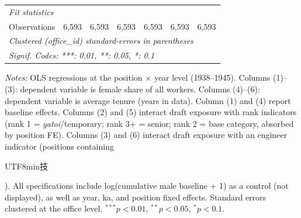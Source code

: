 \begin{table}[htbp]
\begin{threeparttable}
\begin{tabular}{lcccccc}
   \midrule
   \emph{Fit statistics}\\
   Observations                   & 6,593    & 6,593          & 6,593          & 6,593           & 6,593          & 6,593\\  
   \midrule \midrule
   \multicolumn{7}{l}{\emph{Clustered (office\_id) standard-errors in parentheses}}\\
   \multicolumn{7}{l}{\emph{Signif. Codes: ***: 0.01, **: 0.05, *: 0.1}}\\
\end{tabular}
\begin{tablenotes}[flushleft]
\footnotesize
\item \textit{Notes:} OLS regressions at the position $\times$ year level (1938--1945). Columns (1)--(3): dependent variable is female share of all workers. Columns (4)--(6): dependent variable is average tenure (years in data). Column (1) and (4) report baseline effects. Columns (2) and (5) interact draft exposure with rank indicators (rank 1 = \emph{yatoi}/temporary; rank 3+ = senior; rank 2 = base category, absorbed by position FE). Columns (3) and (6) interact draft exposure with an engineer indicator (positions containing \begin{CJK}{UTF8}{min}技\end{CJK}). All specifications include log(cumulative male baseline $+$ 1) as a control (not displayed), as well as year, ka, and position fixed effects. Standard errors clustered at the office level. $^{***}p<0.01$, $^{**}p<0.05$, $^{*}p<0.1$.
\end{tablenotes}
\end{threeparttable}
\end{table}
